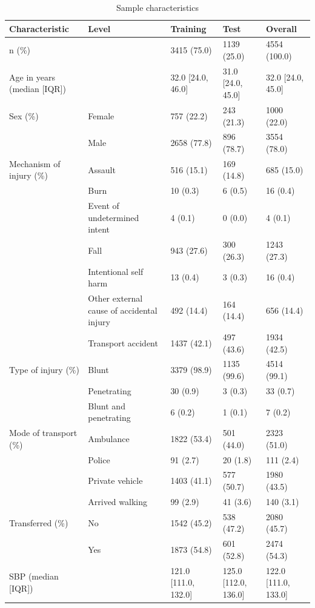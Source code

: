 \documentclass[10pt,letterpaper]{article}\usepackage[]{graphicx}\usepackage[]{color}
\begin{document}
\begin{table}[ht]
\centering
\caption{Sample characteristics} 
\label{tab:sample-characteristics}
\begin{adjustbox}{max width=\textwidth} 
\begin{tabular} 
{lllll}
  \hline
Characteristic & Level & Training & Test & Overall \\ 
  \hline
n (\%) &  & 3415 (75.0) & 1139 (25.0) & 4554 (100.0) \\ 
  Age in years (median [IQR]) &  & 32.0 [24.0, 46.0] & 31.0 [24.0, 45.0] & 32.0 [24.0, 45.0] \\ 
  Sex (\%) & Female & 757 (22.2) & 243 (21.3) & 1000 (22.0) \\ 
   & Male & 2658 (77.8) & 896 (78.7) & 3554 (78.0) \\ 
  Mechanism of injury (\%) & Assault & 516 (15.1) & 169 (14.8) & 685 (15.0) \\ 
   & Burn & 10 (0.3) & 6 (0.5) & 16 (0.4) \\ 
   & Event of undetermined intent & 4 (0.1) & 0 (0.0) & 4 (0.1) \\ 
   & Fall & 943 (27.6) & 300 (26.3) & 1243 (27.3) \\ 
   & Intentional self harm & 13 (0.4) & 3 (0.3) & 16 (0.4) \\ 
   & Other external cause of accidental injury & 492 (14.4) & 164 (14.4) & 656 (14.4) \\ 
   & Transport accident & 1437 (42.1) & 497 (43.6) & 1934 (42.5) \\ 
  Type of injury (\%) & Blunt & 3379 (98.9) & 1135 (99.6) & 4514 (99.1) \\ 
   & Penetrating & 30 (0.9) & 3 (0.3) & 33 (0.7) \\ 
   & Blunt and penetrating & 6 (0.2) & 1 (0.1) & 7 (0.2) \\ 
  Mode of transport (\%) & Ambulance & 1822 (53.4) & 501 (44.0) & 2323 (51.0) \\ 
   & Police & 91 (2.7) & 20 (1.8) & 111 (2.4) \\ 
   & Private vehicle & 1403 (41.1) & 577 (50.7) & 1980 (43.5) \\ 
   & Arrived walking & 99 (2.9) & 41 (3.6) & 140 (3.1) \\ 
  Transferred (\%) & No & 1542 (45.2) & 538 (47.2) & 2080 (45.7) \\ 
   & Yes & 1873 (54.8) & 601 (52.8) & 2474 (54.3) \\ 
  SBP (median [IQR]) &  & 121.0 [111.0, 132.0] & 125.0 [112.0, 136.0] & 122.0 [111.0, 133.0] \\ 

\end{tabular}
\end{adjustbox}
\end{table}
\end{document}
